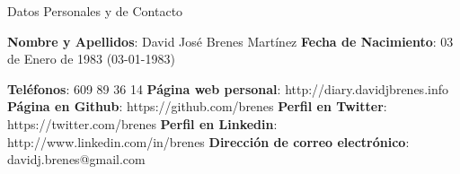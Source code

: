 \begin{rubric}{Datos Personales y de Contacto}


 	\entry*
	\textbf{Nombre y Apellidos}: David José Brenes Martínez
	\entry*
	\textbf{Fecha de Nacimiento}: 03 de Enero de 1983 (03-01-1983)


  	\entry*
	\textbf{Teléfonos}: 609 89 36 14
  	\entry*
	\textbf{Página web personal}: http://diary.davidjbrenes.info
	\entry*
	\textbf{Página en Github}: https://github.com/brenes
	\entry*
	\textbf{Perfil en Twitter}: https://twitter.com/brenes
	\entry*
	\textbf{Perfil en Linkedin}: http://www.linkedin.com/in/brenes
	\entry*
	\textbf{Dirección de correo electrónico}: davidj.brenes@gmail.com

\end{rubric}


